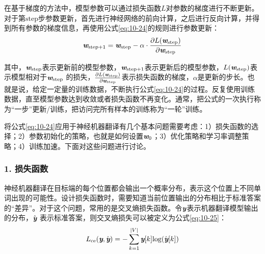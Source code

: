 \parinterval 在基于梯度的方法中，模型参数可以通过损失函数$L$对参数的梯度进行不断更新。对于第$\textrm{step}$步参数更新，首先进行神经网络的前向计算，之后进行反向计算，并得到所有参数的梯度信息，再使用公式\eqref{eq:10-24}的规则进行参数更新：
\vspace{-0.6em}
\begin{eqnarray}
\textbf{\em w}_{\textrm{step}+1} = \textbf{\em w}_{\textrm{step}} - \alpha \cdot \frac{ \partial L(\textbf{\em w}_{\textrm{step}})} {\partial \textbf{\em w}_{\textrm{step}} }
\label{eq:10-24}
\end{eqnarray}

\vspace{-0.6em}
\noindent 其中，$\textbf{\em w}_{\textrm{step}}$表示更新前的模型参数，$\textbf{\em w}_{\textrm{step}+1}$表示更新后的模型参数，$L(\textbf{\em w}_{\textrm{step}})$表示模型相对于$\textbf{\em w}_{\textrm{step}}$ 的损失，$\frac{\partial L(\textbf{\em w}_{\textrm{step}})} {\partial \textbf{\em w}_{\textrm{step}} }$表示损失函数的梯度，$\alpha$是更新的步长。也就是说，给定一定量的训练数据，不断执行公式\eqref{eq:10-24}的过程。反复使用训练数据，直至模型参数达到收敛或者损失函数不再变化。通常，把公式的一次执行称为“一步”更新/训练，把访问完所有样本的训练称为“一轮”训练。

\parinterval 将公式\eqref{eq:10-24}应用于神经机器翻译有几个基本问题需要考虑：1）损失函数的选择；2）参数初始化的策略，也就是如何设置$\textbf{\em w}_0$；3）优化策略和学习率调整策略；4）训练加速。下面对这些问题进行讨论。

\vspace{-1em}
\subsubsection{1. 损失函数}

\parinterval 神经机器翻译在目标端的每个位置都会输出一个概率分布，表示这个位置上不同单词出现的可能性。设计损失函数时，需要知道当前位置输出的分布相比于标准答案的“差异”。对于这个问题，常用的是交叉熵损失函数。令$\textbf{\em y}$表示机器翻译模型输出的分布，$\hat{\textbf{\em y}}$ 表示标准答案，则交叉熵损失可以被定义为公式\eqref{eq:10-25}：
\vspace{-0.6em}
\begin{eqnarray}
L_{\textrm{ce}}(\textbf{\em y},\hat{\textbf{\em y}}) = - \sum_{k=1}^{|V|} \textbf{\em y}[k] \textrm{log} (\hat{\textbf{\em y}}[k])
\label{eq:10-25}
\end{eqnarray}

